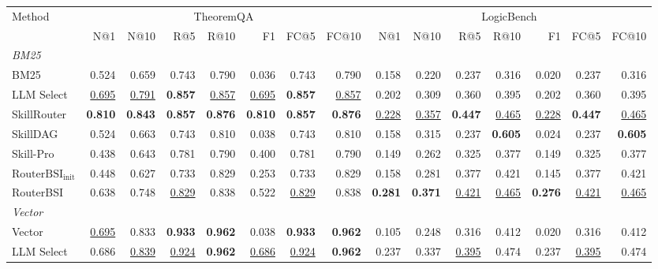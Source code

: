 \begin{table}[t]
\centering
\footnotesize
\setlength{\tabcolsep}{2pt}
\begin{tabular*}{\textwidth}{@{\extracolsep{\fill}}lrrrrrrrrrrrrrr@{}}
\toprule
Method & \multicolumn{7}{c}{TheoremQA} & \multicolumn{7}{c}{LogicBench} \\
\cmidrule(lr){2-8}\cmidrule(lr){9-15}
 & N@1 & N@10 & R@5 & R@10 & F1 & FC@5 & FC@10 & N@1 & N@10 & R@5 & R@10 & F1 & FC@5 & FC@10 \\
\midrule
\multicolumn{15}{l}{\textit{BM25}} \\
\midrule
BM25 & 0.524 & 0.659 & 0.743 & 0.790 & 0.036 & 0.743 & 0.790 & 0.158 & 0.220 & 0.237 & 0.316 & 0.020 & 0.237 & 0.316 \\
LLM Select & \underline{0.695} & \underline{0.791} & \textbf{0.857} & \underline{0.857} & \underline{0.695} & \textbf{0.857} & \underline{0.857} & 0.202 & 0.309 & 0.360 & 0.395 & 0.202 & 0.360 & 0.395 \\
SkillRouter & \textbf{0.810} & \textbf{0.843} & \textbf{0.857} & \textbf{0.876} & \textbf{0.810} & \textbf{0.857} & \textbf{0.876} & \underline{0.228} & \underline{0.357} & \textbf{0.447} & \underline{0.465} & \underline{0.228} & \textbf{0.447} & \underline{0.465} \\
SkillDAG & 0.524 & 0.663 & 0.743 & 0.810 & 0.038 & 0.743 & 0.810 & 0.158 & 0.315 & 0.237 & \textbf{0.605} & 0.024 & 0.237 & \textbf{0.605} \\
Skill-Pro & 0.438 & 0.643 & 0.781 & 0.790 & 0.400 & 0.781 & 0.790 & 0.149 & 0.262 & 0.325 & 0.377 & 0.149 & 0.325 & 0.377 \\
$\mathrm{RouterBSI}_{\mathrm{init}}$ & 0.448 & 0.627 & 0.733 & 0.829 & 0.253 & 0.733 & 0.829 & 0.158 & 0.281 & 0.377 & 0.421 & 0.145 & 0.377 & 0.421 \\
RouterBSI & 0.638 & 0.748 & \underline{0.829} & 0.838 & 0.522 & \underline{0.829} & 0.838 & \textbf{0.281} & \textbf{0.371} & \underline{0.421} & \underline{0.465} & \textbf{0.276} & \underline{0.421} & \underline{0.465} \\
\midrule
\multicolumn{15}{l}{\textit{Vector}} \\
\midrule
Vector & \underline{0.695} & 0.833 & \textbf{0.933} & \textbf{0.962} & 0.038 & \textbf{0.933} & \textbf{0.962} & 0.105 & 0.248 & 0.316 & 0.412 & 0.020 & 0.316 & 0.412 \\
LLM Select & 0.686 & \underline{0.839} & \underline{0.924} & \textbf{0.962} & \underline{0.686} & \underline{0.924} & \textbf{0.962} & 0.237 & 0.337 & \underline{0.395} & 0.474 & 0.237 & \underline{0.395} & 0.474 \\

\end{tabular*}
\end{table}
